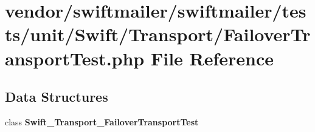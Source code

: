 \section{vendor/swiftmailer/swiftmailer/tests/unit/\+Swift/\+Transport/\+Failover\+Transport\+Test.php File Reference}
\label{_failover_transport_test_8php}
\subsection*{Data Structures}
\begin{DoxyCompactItemize}
\item 
class {\bf Swift\+\_\+\+Transport\+\_\+\+Failover\+Transport\+Test}
\end{DoxyCompactItemize}
